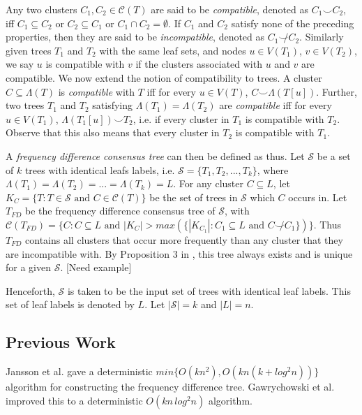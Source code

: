 \documentclass{article}
\newcommand{\compatible}{\smile}
\newcommand{\leafset}{\Lambda}
\begin{document}
    Any two clusters $C_1, C_2 \in \mathcal{C}(T)$ are said to be \textit{compatible}, denoted as $C_1 \compatible C_2$, iff $C_1 \subseteq C_2$ or $C_2 \subseteq C_1$ or $C_1 \cap C_2 = \emptyset$. If $C_1$ and $C_2$ satisfy none of the preceding properties, then they are said to be \textit{incompatible}, denoted as $C_1 \not\compatible C_2$. Similarly given trees $T_1$ and $T_2$ with the same leaf sets, and nodes $u \in V(T_1)$, $v \in V(T_2)$, we say $u$ is compatible with $v$ if the clusters associated with $u$ and $v$ are compatible. We now extend the notion of compatibility to trees. A cluster $C \subseteq \leafset(T)$ is \textit{compatible} with $T$ iff for every $u \in V(T)$, $C \compatible \leafset(T[u])$. Further, two trees $T_1$ and $T_2$ satisfying $\leafset(T_1) = \leafset(T_2)$ are \textit{compatible} iff for every $u \in V(T_1)$, $\leafset(T_1[u]) \compatible T_2$, i.e. if every cluster in $T_1$ is compatible with $T_2$. Observe that this also means that every cluster in $T_2$ is compatible with $T_1$.

    A \textit{frequency difference consensus tree} can then be defined as thus. Let $\mathcal{S}$ be a set of $k$ trees with identical leafs labels, i.e. $\mathcal{S} = \{T_1, T_2, ..., T_k\}$, where $\leafset(T_1) = \leafset(T_2) = ... = \leafset(T_k) = L$. For any cluster $C \subseteq L$, let $K_C = \{T : T \in \mathcal{S} \text{ and } C \in \mathcal{C}(T)\}$ be the set of trees in $\mathcal{S}$ which $C$ occurs in. Let $T_{FD}$ be the frequency difference consensus tree of $\mathcal{S}$, with $\mathcal{C}(T_{FD}) = \{C : C \subseteq L \text{ and } |K_C| > max(\{|K_{C_1}| : C_1 \subseteq L \text{ and } C \not\compatible C_1\})\}$. Thus $T_{FD}$ contains all clusters that occur more frequently than any cluster that they are incompatible with. By Proposition $3$ in \cite{steel2014axiomatic}, this tree always exists and is unique for a given $\mathcal{S}$. [Need example]

    Henceforth, $\mathcal{S}$ is taken to be the input set of trees with identical leaf labels. This set of leaf labels is denoted by $L$. Let $|\mathcal{S}| = k$ and $|L| = n$.

    \subsection{Previous Work}
    Jansson et al. \cite{jansson2018algorithms} gave a deterministic $min\{O(kn^2), O(kn(k + log^2 n))\}$ algorithm for constructing the frequency difference tree. Gawrychowski et al. \cite{gawrychowski2017faster} improved this to a deterministic $O(kn\,log^2n)$ algorithm.
\end{document}
